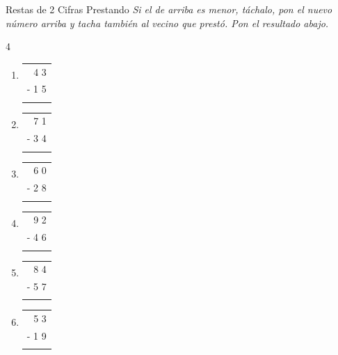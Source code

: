 \documentclass[12pt, letterpaper]{article}
\newcommand{\boxfill}[1][1.2cm]{\tcbox[on line, size=minimal, colframe=valdark!80, colback=white, boxrule=0.5pt, arc=1mm, boxsep=2pt, left=2pt, right=2pt, top=2pt, bottom=2pt]{\makebox[#1]{\vphantom{M}}}}
\begin{document}
	\begin{practica}{Restas de 2 Cifras Prestando }
		\textit{Si el de arriba es menor, táchalo, pon el nuevo número arriba y tacha también al vecino que prestó. Pon el resultado abajo.}
		
		\vspace{0.4cm}
		\begin{multicols}{4}
			\raggedcolumns
			\begin{enumerate}[itemsep=1cm]
				\item 
				\begin{tabular}{r}
					4 3 \\
					- 1 5 \\
					\hline
					\boxfill[1.2cm]
				\end{tabular}
				
				\item 
				\begin{tabular}{r}
					7 1 \\
					- 3 4 \\
					\hline
					\boxfill[1.2cm]
				\end{tabular}
				
				\item 
				\begin{tabular}{r}
					6 0 \\
					- 2 8 \\
					\hline
					\boxfill[1.2cm]
				\end{tabular}
				
				\item 
				\begin{tabular}{r}
					9 2 \\
					- 4 6 \\
					\hline
					\boxfill[1.2cm]
				\end{tabular}
				
				\item 
				\begin{tabular}{r}
					8 4 \\
					- 5 7 \\
					\hline
					\boxfill[1.2cm]
				\end{tabular}
				
				\item 
				\begin{tabular}{r}
					5 3 \\
					- 1 9 \\
					\hline
					\boxfill[1.2cm]
				\end{tabular}
				

\end{enumerate}
\end{multicols}
\end{practica}
\end{document}
